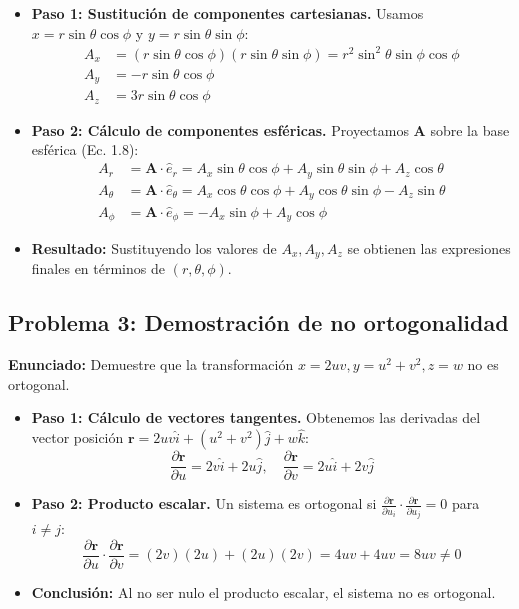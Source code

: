 \documentclass[a4paper]{article}
\begin{document}
\begin{itemize}
    \item \textbf{Paso 1: Sustitución de componentes cartesianas.} Usamos $x = r \sin\theta \cos\phi$ y $y = r \sin\theta \sin\phi$:
    \begin{align*}
        A_x &= (r \sin\theta \cos\phi)(r \sin\theta \sin\phi) = r^2 \sin^2\theta \sin\phi \cos\phi \\
        A_y &= -r \sin\theta \cos\phi \\
        A_z &= 3r \sin\theta \cos\phi
    \end{align*}
    \item \textbf{Paso 2: Cálculo de componentes esféricas.} Proyectamos $\mathbf{A}$ sobre la base esférica (Ec. 1.8):
    \begin{align*}
        A_r &= \mathbf{A} \cdot \hat{e}_r = A_x \sin\theta \cos\phi + A_y \sin\theta \sin\phi + A_z \cos\theta \\
        A_\theta &= \mathbf{A} \cdot \hat{e}_\theta = A_x \cos\theta \cos\phi + A_y \cos\theta \sin\phi - A_z \sin\theta \\
        A_\phi &= \mathbf{A} \cdot \hat{e}_\phi = -A_x \sin\phi + A_y \cos\phi
    \end{align*}
    \item \textbf{Resultado:} Sustituyendo los valores de $A_x, A_y, A_z$ se obtienen las expresiones finales en términos de $(r, \theta, \phi)$.
\end{itemize}

\subsection*{Problema 3: Demostración de no ortogonalidad}
\textbf{Enunciado:} Demuestre que la transformación $x = 2uv, y = u^2+v^2, z = w$ no es ortogonal.

\begin{itemize}
    \item \textbf{Paso 1: Cálculo de vectores tangentes.} Obtenemos las derivadas del vector posición $\mathbf{r} = 2uv\hat{i} + (u^2+v^2)\hat{j} + w\hat{k}$:
    \begin{equation}
        \frac{\partial \mathbf{r}}{\partial u} = 2v\hat{i} + 2u\hat{j}, \quad \frac{\partial \mathbf{r}}{\partial v} = 2u\hat{i} + 2v\hat{j}
    \end{equation}
    \item \textbf{Paso 2: Producto escalar.} Un sistema es ortogonal si $\frac{\partial \mathbf{r}}{\partial u_i} \cdot \frac{\partial \mathbf{r}}{\partial u_j} = 0$ para $i \neq j$:
    \begin{equation}
        \frac{\partial \mathbf{r}}{\partial u} \cdot \frac{\partial \mathbf{r}}{\partial v} = (2v)(2u) + (2u)(2v) = 4uv + 4uv = 8uv \neq 0
    \end{equation}
    \item \textbf{Conclusión:} Al no ser nulo el producto escalar, el sistema no es ortogonal.
\end{itemize}
\end{document}
